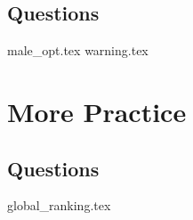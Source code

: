 \documentclass{exam}
\begin{document}
\subsection{Questions}
\begin{questions}
{male_opt.tex}
{warning.tex}
\end{questions}

\section{More Practice}
\subsection{Questions}
\begin{questions}
{global_ranking.tex}
\end{questions}

\end{document}
